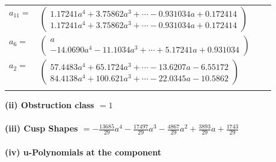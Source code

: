 \documentclass[1p]{elsarticle_modified}
\theoremstyle{definition}
\begin{document}
\begin{tabular}{m{7pt} m{180pt} m{7pt} m{180pt} }
\flushright $a_{11}=$&$\begin{pmatrix}1.17241 a^{4}+3.75862 a^{3}+\cdots-0.931034 a+0.172414\\1.17241 a^{4}+3.75862 a^{3}+\cdots-0.931034 a+0.172414\end{pmatrix}$ \\
\flushright $a_{6}=$&$\begin{pmatrix}a\\-14.0690 a^{4}-11.1034 a^{3}+\cdots+5.17241 a+0.931034\end{pmatrix}$ \\
\flushright $a_{2}=$&$\begin{pmatrix}57.4483 a^{4}+65.1724 a^{3}+\cdots-13.6207 a-6.55172\\84.4138 a^{4}+100.621 a^{3}+\cdots-22.0345 a-10.5862\end{pmatrix}$\\&\end{tabular}
\flushleft \textbf{(ii) Obstruction class $= 1$}\\~\\
\flushleft \textbf{(iii) Cusp Shapes $= -\frac{13685}{29} a^4-\frac{17497}{29} a^3-\frac{4867}{29} a^2+\frac{3893}{29} a+\frac{1743}{29}$}\\~\\
\newpage\renewcommand{\arraystretch}{1}
\flushleft \textbf{(iv) u-Polynomials at the component}\newline \\
\end{document}
